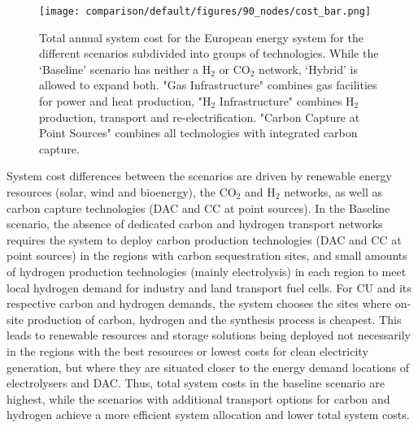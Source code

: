\documentclass[twocolumn]{article}
\newcommand{\carbon}{CO$_2$}
\newcommand{\hydrogen}{H$_2$}
\begin{document}
\begin{figure}[ht!]
    \centering
    \texttt{[image: comparison/default/figures/90\_nodes/cost\_bar.png]}
    \caption[short]{Total annual system cost for the European energy system for the different scenarios subdivided into groups of technologies. While the `Baseline' scenario has neither a \hydrogen{} or \carbon{} network, `Hybrid' is allowed to expand both. "Gas Infrastructure" combines gas facilities for power and heat production, "H$_2$ Infrastructure" combines H$_2$ production, transport and re-electrification. "Carbon Capture at Point Sources" combines all technologies with integrated carbon capture.}
    \label{fig:cost_bar}
\end{figure}

System cost differences between the scenarios are driven by renewable energy resources (solar, wind and bioenergy), the \carbon{} and \hydrogen{} networks, as well as carbon capture technologies (DAC and CC at point sources).
In the Baseline scenario, the absence of dedicated carbon and hydrogen transport networks requires the system to deploy carbon production technologies (DAC and CC at point sources) in the regions with carbon sequestration sites, and small amounts of hydrogen production technologies (mainly electrolysis) in each region to meet local hydrogen demand for industry and land transport fuel cells.
For CU and its respective carbon and hydrogen demands, the system chooses the sites where on-site production of carbon, hydrogen and the synthesis process is cheapest. This leads to renewable resources and storage solutions being deployed not necessarily in the regions with the best resources or lowest costs for clean electricity generation, but where they are situated closer to the energy demand locations of electrolysers and DAC.
Thus, total system costs in the baseline scenario are highest, while the scenarios with additional transport options for carbon and hydrogen achieve a more efficient system allocation and lower total system costs.
\end{document}
